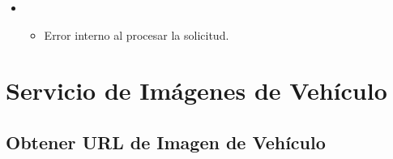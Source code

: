 \documentclass[letterpaper,10pt,spanish]{sphinxmanual}
\begin{document}
\begin{fulllineitems}
\begin{itemize}
\begin{itemize}
\end{itemize}

\begin{sphinxVerbatim}[commandchars=\\\{\}]
\end{sphinxVerbatim}

\item {} 
\sphinxAtStartPar
{}
\begin{itemize}
\item {} 
\sphinxAtStartPar
Error interno al procesar la solicitud.

\end{itemize}

\end{itemize}

\end{fulllineitems}



\section{Servicio de Imágenes de Vehículo}
\label{\detokenize{endpoints:servicio-de-imagenes-de-vehiculo}}

\subsection{Obtener URL de Imagen de Vehículo}
\label{\detokenize{endpoints:obtener-url-de-imagen-de-vehiculo}}
\end{document}

